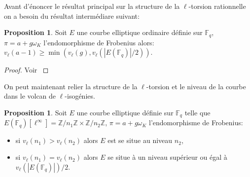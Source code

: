 \documentclass[10pt,a4paper]{book}
\theoremstyle{plain}
\theoremstyle{definition}
\theoremstyle{definition}
\theoremstyle{definition}
\newtheorem{prop}[thm]{Proposition}
\theoremstyle{definition}
\theoremstyle{remark}
\theoremstyle{remark}
\theoremstyle{definition}
\begin{document}
Avant d'énoncer le résultat principal sur la structure de la $\ell$-torsion rationnelle on a besoin du résultat intermédiare suivant:

\begin{prop}
Soit $E$ une courbe elliptique ordinaire définie sur $\mathbb{F}_q$, $\pi=a+g \omega_K$ l'endomorphisme de Frobenius alors: $v_{\ell}(a-1) \geqslant \min(v_{\ell}(g),v_{\ell}(|E(\mathbb{F}_q)|/2))$.
\end{prop}

\begin{proof}
Voir \cite[Lemma 5.2]{Ionica2010}
\end{proof}

On peut maintenant relier la structure de la $\ell$-torsion et le niveau de la courbe dans le volcan de $\ell$-isogénies.

\begin{prop}
\label{pro:niv:str}
Soit $E$ une courbe elliptique définie sur $\mathbb{F}_q$ telle que $E(\mathbb{F}_q)[\ell^{\infty}]=\mathbb{Z}/n_1\mathbb{Z} \times \mathbb{Z}/n_2\mathbb{Z}$, $\pi = a + g \omega_K$ l'endomorphisme de Frobenius:
\begin{itemize}
\item si $v_{\ell}(n_1)>v_{\ell}(n_2)$ alors $E$ est se situe au niveau $n_2$,
\item si $v_{\ell}(n_1)=v_{\ell}(n_2)$ alors $E$ se situe à un niveau supérieur ou égal à $v_{\ell}(|E(\mathbb{F}_q)|)/2$.
\end{itemize}
\end{prop}
\end{document}
